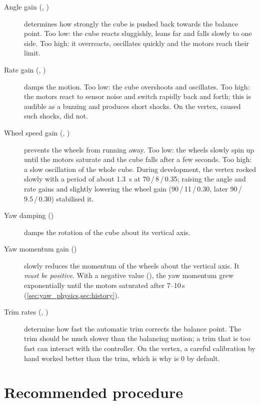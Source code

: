 \begin{description}
  \item[Angle gain (, )] determines how strongly the cube is pushed back towards
    the balance point. Too low: the cube reacts sluggishly, leans far and falls slowly to one side.
    Too high: it overreacts, oscillates quickly and the motors reach their limit.
  \item[Rate gain (, )] damps the motion. Too low: the cube overshoots and
    oscillates. Too high: the motors react to sensor noise and switch rapidly back and forth; this
    is audible as a buzzing and produces short shocks. On the vertex,  caused such
    shocks,  did not.
  \item[Wheel speed gain (, )] prevents the wheels from running away. Too low:
    the wheels slowly spin up until the motors saturate and the cube falls after a few seconds.
    Too high: a slow oscillation of the whole cube. During development, the vertex rocked slowly
    with a period of about \SI{1.3}{s} at 70\,/\,8\,/\,0.35; raising the angle and rate gains and
    slightly lowering the wheel gain (90\,/\,11\,/\,0.30, later 90\,/\,9.5\,/\,0.30) stabilised it.
  \item[Yaw damping ()] damps the rotation of the cube about its vertical axis.
  \item[Yaw momentum gain ()] slowly reduces the momentum of the wheels about the
    vertical axis. It \emph{must be positive}. With a negative value (), the yaw momentum
    grew exponentially until the motors saturated after 7--10\,s
    (\cref{sec:yaw_physics,sec:history}).
  \item[Trim rates (, )] determine how fast the automatic trim corrects the
    balance point. The trim should be much slower than the balancing motion; a trim that is too
    fast can interact with the controller. On the vertex, a careful calibration by hand worked
    better than the trim, which is why  is 0 by default.
\end{description}

\section{Recommended procedure}

